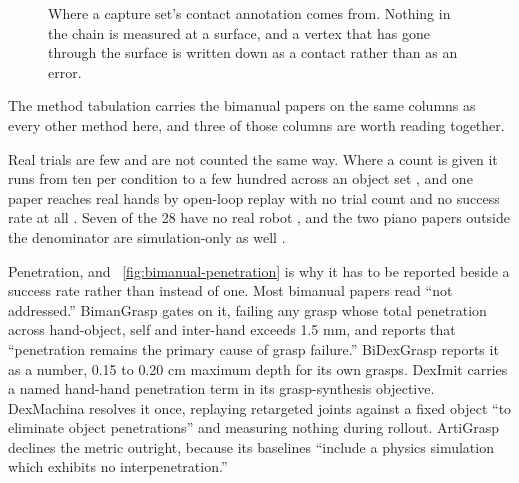 \begin{figure}[!t]
  \centering
  \caption{Where a capture set's contact annotation comes from. Nothing in the chain is measured
  at a surface, and a vertex that has gone through the surface is written down as a contact rather
  than as an error.}
  \label{fig:contactlabel}
\end{figure}

\label{subsec:bimanual_axes}
The method tabulation carries the bimanual papers on the same columns as every other method here,
and three of those columns are worth reading together.

Real trials are few and are not counted the same way. Where a count is given it runs from ten per
condition to a few hundred across an object set
\cite{asymdex_2024,hato_visuotactile_2024,dexmimicgen_2024,bidexgrasp_2026}, and one paper reaches
real hands by open-loop replay with no trial count and no success rate at all
\cite{maniptrans_2025}. Seven of the 28 have no real robot
\cite{artigrasp_2023,bidexhd_2024,dexmachina_2025,dexman_2025,dexpbt_2023,dydexhandover_2025,pianomime_2024},
and the two piano papers outside the denominator are simulation-only as well
\cite{robopianist_2023,rp1m_2024}.

\providecommand{\plateGraspPenetration}{}\plateGraspPenetration

Penetration, and \figurename~\ref{fig:bimanual-penetration} is why it has to be reported beside a
success rate rather than instead of one. Most bimanual papers read ``not addressed.'' BimanGrasp \cite{bimangrasp_2024} gates on
it, failing any grasp whose total penetration across hand-object, self and inter-hand exceeds 1.5
mm, and reports that ``penetration remains the primary cause of grasp failure.'' BiDexGrasp
\cite{bidexgrasp_2026} reports it as a number, 0.15 to 0.20 cm maximum depth for its own grasps.
DexImit \cite{deximit_2026} carries a named hand-hand penetration term in its grasp-synthesis
objective. DexMachina \cite{dexmachina_2025} resolves it once, replaying retargeted joints against
a fixed object ``to eliminate object penetrations'' and measuring nothing during rollout.
ArtiGrasp \cite{artigrasp_2023} declines the metric outright, because its baselines ``include a
physics simulation which exhibits no interpenetration.''


